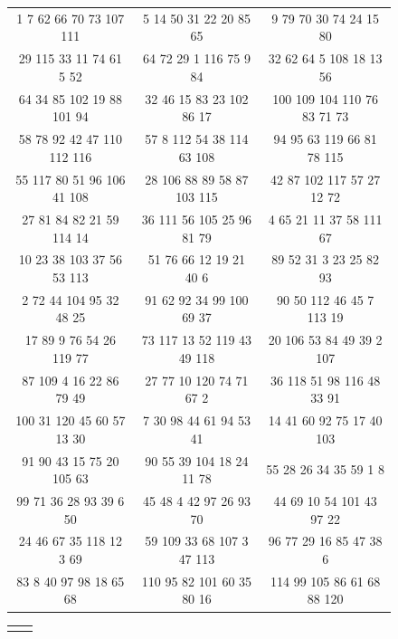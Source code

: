 \begin{figure}[h!]
\centering %
\begin{tabular}{|c | c |c |} %
\hline %
1	7	62	66	70	73	107	111 &	5	14	50	31	22	20	85	65 &	9	79	70	30	74	24	15	80\\
29	115	33	11	74	61	5	52	& 64	72	29	1	116	75	9	84 &	32	62	64	5	108	18	13	56\\
64	34	85	102	19	88	101	94	& 32	46	15	83	23	102	86	17 &	100	109	104	110	76	83	71	73\\
58	78	92	42	47	110	112	116	& 57	8	112	54	38	114	63	108 &	94	95	63	119	66	81	78	115\\
55	117	80	51	96	106	41	108	& 28	106	88	89	58	87	103	115	&   42	87	102	117	57	27	12	72\\
27	81	84	82	21	59	114	14	& 36	111	56	105	25	96	81	79	&   4	65	21	11	37	58	111	67\\
10	23	38	103	37	56	53	113	& 51	76	66	12	19	21	40	6	&   89	52	31	3	23	25	82	93\\
2	72	44	104	95	32	48	25	& 91	62	92	34	99	100	69	37	&   90	50	112	46	45	7	113	19\\
17	89	9	76	54	26	119	77	& 73	117	13	52	119	43	49	118	&   20	106	53	84	49	39	2	107\\
87	109	4	16	22	86	79	49	& 27	77	10	120	74	71	67	2	&   36	118	51	98	116	48	33	91\\
100	31	120	45	60	57	13	30	& 7	    30	98	44	61	94	53	41	&   14  41	60	92	75	17	40	103\\
91	90	43	15	75	20	105	63	& 90	55	39	104	18	24	11	78	&   55	28	26	34	35	59	1	8\\
99	71	36	28	93	39	6	50	& 45	48	4	42	97	26	93	70	&   44	69	10	54	101	43	97	22\\
24	46	67	35	118	12	3	69	& 59	109	33	68	107	3	47	113	&   96	77	29	16	85	47	38	6\\
83	8	40	97	98	18	65	68	& 110	95	82	101	60	35	80	16	&  114	99	105	86	61	68	88	120\\
\hline
\end{tabular}

\centering
\begin{tabular}{c c }
  & \\
\end{tabular}


\end{figure}
